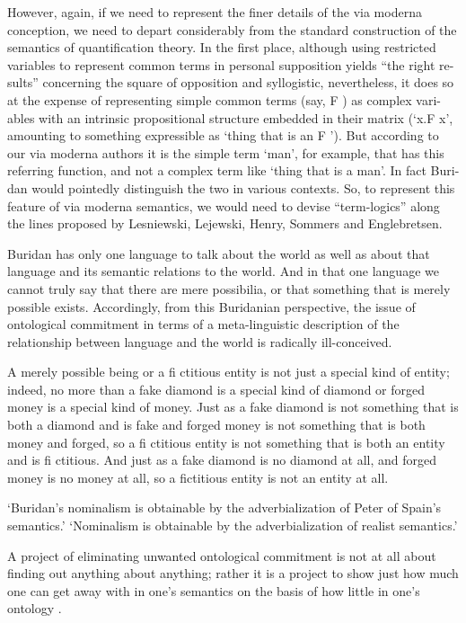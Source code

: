 \documentclass[]{article}
\begin{document}
However, again, if we need to represent the ﬁner details of the via moderna
conception, we need to depart considerably from the standard construction of the
semantics of quantiﬁcation theory. In the ﬁrst place, although using restricted
variables to represent common terms in personal supposition yields “the right re-
sults” concerning the square of opposition and syllogistic, nevertheless, it does so
at the expense of representing simple common terms (say, F ) as complex vari-
ables with an intrinsic propositional structure embedded in their matrix (‘x.F x’,
amounting to something expressible as ‘thing that is an F ’). But according to
our via moderna authors it is the simple term ‘man’, for example, that has this
referring function, and not a complex term like ‘thing that is a man’. In fact Buri-
dan would pointedly distinguish the two in various contexts. So, to represent this
feature of via moderna semantics, we would need to devise “term-logics” along the
lines proposed by Lesniewski, Lejewski, Henry, Sommers and Englebretsen.\autocite{Klima2008a}

Buridan has only one language to talk about the world as well as about that
language and its semantic relations to the world. And in that one language
we cannot truly say that there are mere possibilia, or that something that is
merely possible exists. Accordingly, from this Buridanian perspective, the
issue of ontological commitment in terms of a meta-linguistic description of
the relationship between language and the world is radically ill-conceived.\autocite[172]{Klima2009}

A merely possible being or a ﬁ ctitious entity is not just
a special kind of entity; indeed, no more than a fake diamond is a special
kind of diamond or forged money is a special kind of money. Just as a fake
diamond is not something that is both a diamond and is fake and forged
money is not something that is both money and forged, so a ﬁ ctitious entity
is not something that is both an entity and is ﬁ ctitious. And just as a fake
diamond is no diamond at all, and forged money is no money at all, so a
ﬁctitious entity is not an entity at all.\autocite[173]{Klima2009}

`Buridan’s nominalism is obtainable by the adverbialization of Peter
of Spain’s semantics.'
`Nominalism is obtainable by the adverbialization of realist
semantics.'


A project of eliminating unwanted
ontological commitment is not at all about finding out anything about anything;
rather it is a project to show just how much one can get away with in one’s
semantics on the basis of how little in one’s ontology \autocite[412]{Klima2012}.
\end{document}
